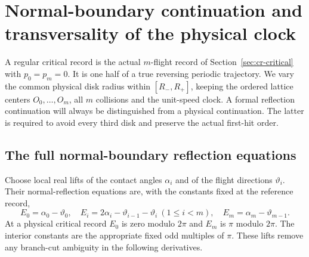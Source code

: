 \section{Normal-boundary continuation and transversality of the physical clock}
\label{sec:cc-clock}
A regular critical record is the actual $m$-flight record of
Section~\ref{sec:cr-critical} with $p_0=p_m=0$.  It is one half of a
true reversing periodic trajectory.  We vary the common physical
disk radius within $[R_-,R_+]$, keeping the ordered lattice centers
$O_0,\ldots,O_m$, all $m$ collisions and the unit-speed clock.  A
formal reflection continuation will always be distinguished from a
physical continuation.  The latter is required to avoid every third
disk and preserve the actual first-hit order.

\subsection{The full normal-boundary reflection equations}
Choose local real lifts of the contact angles $\alpha_i$ and of the
flight directions $\vartheta_i$.  Their normal-reflection equations
are, with the constants fixed at the reference record,
\begin{equation}\label{eq:cc-reflection}
 E_0=\alpha_0-\vartheta_0,\quad
 E_i=2\alpha_i-\vartheta_{i-1}-\vartheta_i\ (1\leq i<m),\quad
 E_m=\alpha_m-\vartheta_{m-1}.
\end{equation}
At a physical critical record $E_0$ is zero modulo $2\pi$ and
$E_m$ is $\pi$ modulo $2\pi$.  The interior constants are the
appropriate fixed odd multiples of $\pi$.  These lifts remove any
branch-cut ambiguity in the following derivatives.

